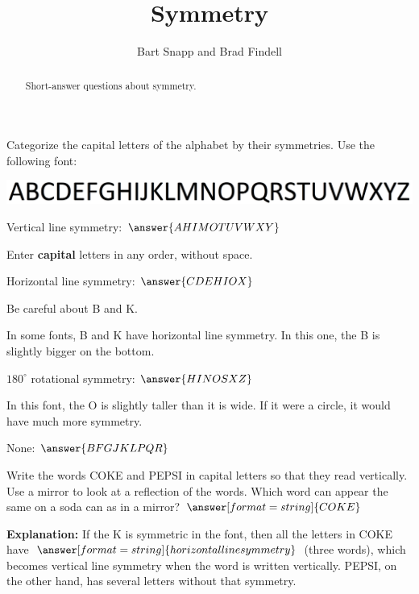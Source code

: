 \documentclass[nooutcomes]{ximera}
\title{Symmetry}
\author{Bart Snapp and Brad Findell}
\begin{document}
\begin{abstract}
Short-answer questions about symmetry. 
\end{abstract}
\maketitle

\begin{question}
Categorize the capital letters of the alphabet by their symmetries.  Use the following font: 
\begin{image}
\includegraphics[scale=0.35]{alphabet.png}
\end{image}
\begin{question}
Vertical line symmetry:  $\answer{AHIMOTUVWXY}$
\begin{feedback}[attempt]
Enter \textbf{capital} letters in any order, without space.
\end{feedback}
\end{question}
\begin{question}
Horizontal line symmetry:  $\answer{CDEHIOX}$  
\begin{feedback}[attempt]
Be careful about B and K.  
\end{feedback}
\begin{feedback}[correct]
In some fonts, B and K have horizontal line symmetry.  In this one, the B is slightly bigger on the bottom.  
\end{feedback}
\end{question}
\begin{question}
$180^\circ$ rotational symmetry: $\answer{HINOSXZ}$
\begin{feedback}[correct]
In this font, the O is slightly taller than it is wide.  If it were a circle, it would have much more symmetry.
\end{feedback}
\end{question}
\begin{question}
None: $\answer{BFGJKLPQR}$
\end{question}
\end{question}

\begin{question}
Write the words COKE and PEPSI in capital letters so that they read vertically.  Use a mirror to look at a reflection of the words.  Which word can appear the same on a soda can as in a mirror?  $\answer[format=string]{COKE}$
\begin{question}
\textbf{Explanation:} If the K is symmetric in the font, then all the letters in COKE have $\answer[format=string]{horizontal line symmetry}$ (three words), which becomes vertical line symmetry when the word is written vertically. PEPSI, on the other hand, has several letters without that symmetry.  
\end{question}
\end{question}
\end{document}
